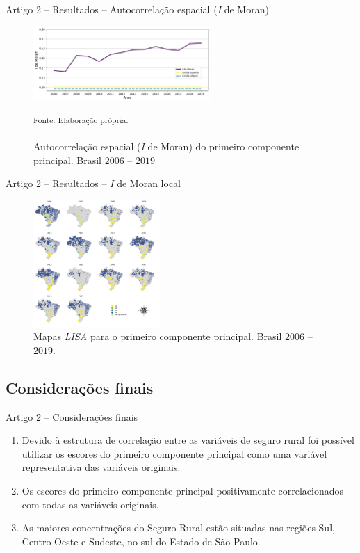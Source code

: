 \documentclass[aspectratio=169]{beamer}
\begin{document}
\begin{frame}{Artigo 2 -- Resultados -- Autocorrelação espacial (\textit{I} de Moran)}
	\begin{figure}
		\centering
	    \includegraphics[width=0.6\textwidth]{img/i_de_moran_cp1.png}
	    \caption{Autocorrelação espacial (\textit{I} de Moran) do primeiro componente principal. Brasil $2006$ -- $2019$}
		\small \textsuperscript {Fonte: Elaboração própria.}
	\end{figure}
\end{frame}

\begin{frame}{Artigo 2 -- Resultados -- \textit{I} de Moran local}
	\begin{figure}
		\centering
		\includegraphics[width=0.43\textwidth]{img/map_lisa_cp1_viridis.png}
		\caption{Mapas \textit{LISA} para o primeiro componente principal.  Brasil $2006$ -- $2019$.}
	\end{figure}
\end{frame}

\subsection{Considerações finais}

\begin{frame}{Artigo 2 -- Considerações finais}
	\begin{enumerate}
	    \item Devido à estrutura de correlação entre as variáveis de seguro rural foi possível utilizar os escores do primeiro componente principal como uma variável representativa das variáveis originais. 
	    \vspace{0.25cm}
	    \item Os escores do primeiro componente principal positivamente correlacionados com todas as variáveis originais. 
	    \vspace{0.25cm}
	    \item As maiores concentrações do Seguro Rural estão situadas nas regiões  Sul, Centro-Oeste e Sudeste, no sul do Estado de São Paulo.
    \end{enumerate}
\end{frame}
\end{document}
